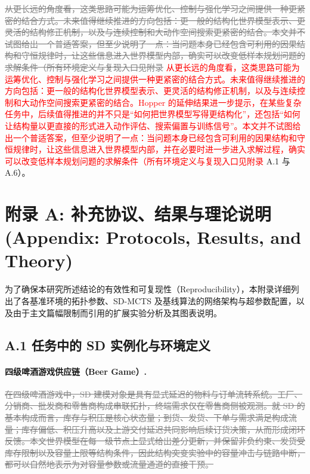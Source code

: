 \documentclass[UTF8]{ctexart}
\let\oldparagraph\paragraph
\renewcommand{\paragraph}[1]{\oldparagraph{#1}\mbox{}}
\newcommand{\revadd}[1]{\textcolor{red}{#1}}
\newcommand{\revdel}[1]{\textcolor{gray}{\sout{#1}}}
\begin{document}
\revdel{从更长远的角度看，这类思路可能为运筹优化、控制与强化学习之间提供一种更紧密的结合方式。未来值得继续推进的方向包括：更一般的结构化世界模型表示、更灵活的结构修正机制，以及与连续控制和大动作空间搜索更紧密的结合。本文并不试图给出一个普适答案，但至少说明了一点：当问题本身已经包含可利用的因果结构和守恒规律时，让这些信息进入世界模型内部，确实可以改变低样本规划问题的求解条件（所有环境定义与复现入口见附录}
\revadd{从更长远的角度看，这类思路可能为运筹优化、控制与强化学习之间提供一种更紧密的结合方式。未来值得继续推进的方向包括：更一般的结构化世界模型表示、更灵活的结构修正机制，以及与连续控制和大动作空间搜索更紧密的结合。Hopper 的延伸结果进一步提示，在某些复杂任务中，后续值得推进的并不只是“如何把世界模型写得更结构化”，还包括“如何让结构量以更直接的形式进入动作评估、搜索偏置与训练信号”。本文并不试图给出一个普适答案，但至少说明了一点：当问题本身已经包含可利用的因果结构和守恒规律时，让这些信息进入世界模型内部，并在必要时进一步进入求解过程，确实可以改变低样本规划问题的求解条件（所有环境定义与复现入口见附录}
A.1 与 A.6）。

\hypertarget{ux9644ux5f55-a-ux5b9eux9a8cux7ec6ux8282ux4e0eux590dux73b0ux6307ux5f15-appendix-experimental-details-and-reproducibility}{%
\section{附录 A: 补充协议、结果与理论说明 (Appendix: Protocols, Results, and Theory)}\label{ux9644ux5f55-a-ux5b9eux9a8cux7ec6ux8282ux4e0eux590dux73b0ux6307ux5f15-appendix-experimental-details-and-reproducibility}}

为了确保本研究所述结论的有效性和可复现性（Reproducibility），本附录详细列出了各基准环境的拓扑参数、SD-MCTS
及基线算法的网络架构与超参数配置，以及由于主文篇幅限制而引用的扩展实验分析及其图表说明。

\hypertarget{a.1-ux5b9eux9a8cux73afux5883ux8bbeux8ba1ux7ec6ux8282}{%
\subsection{A.1
任务中的 SD 实例化与环境定义}\label{a.1-ux5b9eux9a8cux73afux5883ux8bbeux8ba1ux7ec6ux8282}}

\paragraph{四级啤酒游戏供应链（Beer Game）.}
\revdel{在四级啤酒游戏中，SD 建模对象是具有显式延迟的物料与订单流转系统。工厂、分销商、批发商和零售商构成串联拓扑，终端需求仅在零售商侧被观测。就 SD 的基本构成而言，库存与积压是核心状态量；到货、发货、下单与需求满足构成流量；库存偏低、积压升高以及上游交付延迟共同影响后续订货决策，从而形成闭环反馈。本文世界模型在每一级节点上显式给出差分更新，并保留非负约束、发货受库存限制以及容量上限等结构条件，因此结构突变实验中的容量冲击与链路中断，都可以自然地表示为对容量参数或流量通道的直接干预。}
\end{document}

